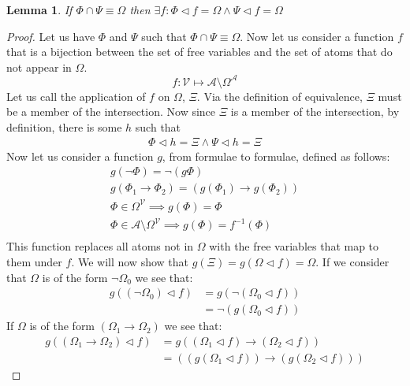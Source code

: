 \documentclass{article}
\newtheorem{lem}{Lemma}
\begin{document}
\begin{lem}
If $\Phi \cap \Psi \equiv \Omega$ then $\exists f: \Phi \lhd f = \Omega \land \Psi \lhd f = \Omega$
\end{lem}
\begin{proof}
Let us have $\Phi$ and $\Psi$ such that $\Phi \cap \Psi \equiv \Omega$.
Now let us consider a function $f$ that is a bijection between the set of free variables and the set of atoms that do not appear in $\Omega$.
\begin{equation*}
f : \mathcal{V} \mapsto \mathcal{A}\setminus\Omega^{\mathcal{A}}
\end{equation*}
Let us call the application of $f$ on $\Omega$, $\Xi$.
Via the definition of equivalence, $\Xi$ must be a member of the intersection.
Now since $\Xi$ is a member of the intersection, by definition, there is some $h$ such that
\begin{align*}
\Phi \lhd h = \Xi \land \Psi \lhd h = \Xi
\end{align*}
Now let us consider a function $g$, from formulae to formulae, defined as follows:
\begin{gather*}
g (\neg\Phi) = \neg (g \Phi) \\
g (\Phi_1 \rightarrow \Phi_2) = (g(\Phi_1)\rightarrow g(\Phi_2)) \\
\Phi \in \Omega^{\mathcal{V}} \implies g(\Phi) = \Phi\\
\Phi \in \mathcal{A}\setminus \Omega^{\mathcal{V}} \implies g(\Phi) = f^{-1} (\Phi)\\
\end{gather*}
This function replaces all atoms not in $\Omega$ with the free variables that map to them under $f$.
We will now show that $g (\Xi) = g (\Omega \lhd f) = \Omega$.
If we consider that $\Omega$ is of the form $\neg \Omega_0$ we see that:
\begin{align*}
   g ((\neg \Omega_0) \lhd f)
&= g (\neg (\Omega_0 \lhd f)) \tag{Definition of Assignment}\\
&= \neg(g (\Omega_0 \lhd f))  \tag{Definition of $g$}       
\end{align*}
If $\Omega$ is of the form $(\Omega_1 \rightarrow \Omega_2)$ we see that:
\begin{align*}
   g ((\Omega_1 \rightarrow \Omega_2) \lhd f)
&= g ((\Omega_1 \lhd f) \rightarrow (\Omega_2 \lhd f))      \tag{Definition of Assignment} \\
&=((g (\Omega_1 \lhd f)) \rightarrow (g (\Omega_2 \lhd f))) \tag{Definition of $g$}
\end{align*}

\end{proof}
\end{document}
